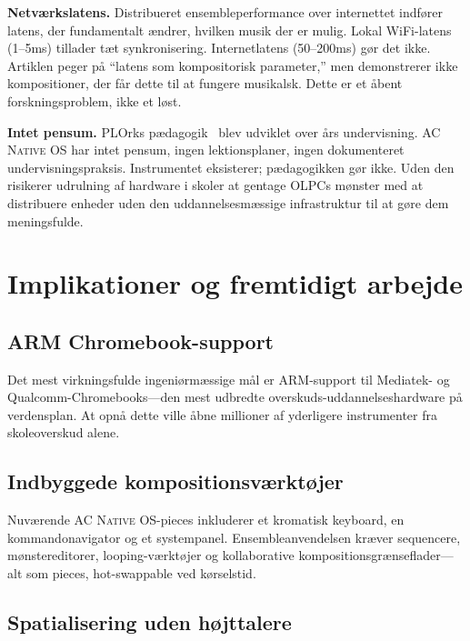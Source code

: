 \documentclass[10pt,letterpaper,twocolumn]{article}
\newcommand{\acos}{\textsc{AC Native OS}}
\begin{document}
\textbf{Netv{\ae}rkslatens.} Distribueret ensembleperformance over internettet indf{\o}rer latens, der fundamentalt {\ae}ndrer, hvilken musik der er mulig. Lokal WiFi-latens (1--5ms) tillader t{\ae}t synkronisering. Internetlatens (50--200ms) g{\o}r det ikke. Artiklen peger p{\aa} ``latens som kompositorisk parameter,'' men demonstrerer ikke kompositioner, der f{\aa}r dette til at fungere musikalsk. Dette er et {\aa}bent forskningsproblem, ikke et l{\o}st.

\textbf{Intet pensum.} PLOrks p{\ae}dagogik~\citep{trueman2007why} blev udviklet over {\aa}rs undervisning. \acos{} har intet pensum, ingen lektionsplaner, ingen dokumenteret undervisningspraksis. Instrumentet eksisterer; p{\ae}dagogikken g{\o}r ikke. Uden den risikerer udrulning af hardware i skoler at gentage OLPCs m{\o}nster med at distribuere enheder uden den uddannelsesm{\ae}ssige infrastruktur til at g{\o}re dem meningsfulde.


\section{Implikationer og fremtidigt arbejde}
\label{sec:future}

\subsection{ARM Chromebook-support}

Det mest virkningsfulde ingeni{\o}rm{\ae}ssige m{\aa}l er ARM-support til Mediatek- og Qualcomm-Chromebooks---den mest udbredte overskuds-uddannelseshardware p{\aa} verdensplan. At opn{\aa} dette ville {\aa}bne millioner af yderligere instrumenter fra skoleoverskud alene.

\subsection{Indbyggede kompositionsv{\ae}rkt{\o}jer}

Nuv{\ae}rende \acos{}-pieces inkluderer et kromatisk keyboard, en kommandonavigator og et systempanel. Ensembleanvendelsen kr{\ae}ver sequencere, m{\o}nstereditorer, looping-v{\ae}rkt{\o}jer og kollaborative kompositionsgr{\ae}nseflader---alt som pieces, hot-swappable ved k{\o}rselstid.

\subsection{Spatialisering uden h{\o}jttalere}
\end{document}
